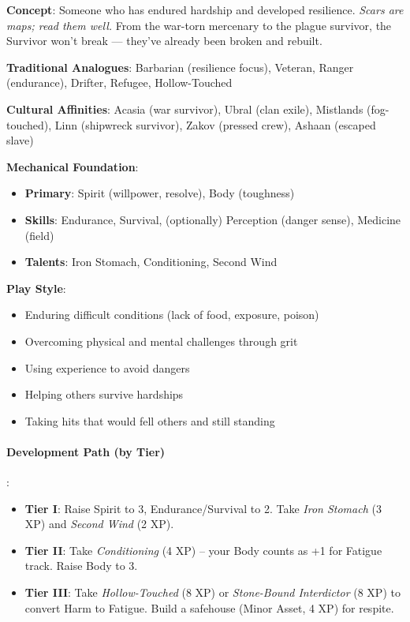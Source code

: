 \textbf{Concept}: Someone who has endured hardship and developed resilience. \emph{Scars are maps; read them well.} From the war-torn mercenary to the plague survivor, the Survivor won't break --- they've already been broken and rebuilt.

\textbf{Traditional Analogues}: Barbarian (resilience focus), Veteran, Ranger (endurance), Drifter, Refugee, Hollow-Touched

\textbf{Cultural Affinities}: Acasia (war survivor), Ubral (clan exile), Mistlands (fog-touched), Linn (shipwreck survivor), Zakov (pressed crew), Ashaan (escaped slave)

\textbf{Mechanical Foundation}:
\begin{itemize}
\item \textbf{Primary}: Spirit (willpower, resolve), Body (toughness)
\item \textbf{Skills}: Endurance, Survival, (optionally) Perception (danger sense), Medicine (field)
\item \textbf{Talents}: Iron Stomach, Conditioning, Second Wind
\end{itemize}

\textbf{Play Style}:
\begin{itemize}
\item Enduring difficult conditions (lack of food, exposure, poison)
\item Overcoming physical and mental challenges through grit
\item Using experience to avoid dangers
\item Helping others survive hardships
\item Taking hits that would fell others and still standing
\end{itemize}

\paragraph{Development Path (by Tier)}:
\begin{itemize}
\item \textbf{Tier I}: Raise Spirit to 3, Endurance/Survival to 2. Take \emph{Iron Stomach} (3 XP) and \emph{Second Wind} (2 XP).
\item \textbf{Tier II}: Take \emph{Conditioning} (4 XP) -- your Body counts as +1 for Fatigue track. Raise Body to 3.
\item \textbf{Tier III}: Take \emph{Hollow-Touched} (8 XP) or \emph{Stone-Bound Interdictor} (8 XP) to convert Harm to Fatigue. Build a safehouse (Minor Asset, 4 XP) for respite.
\end{itemize}

